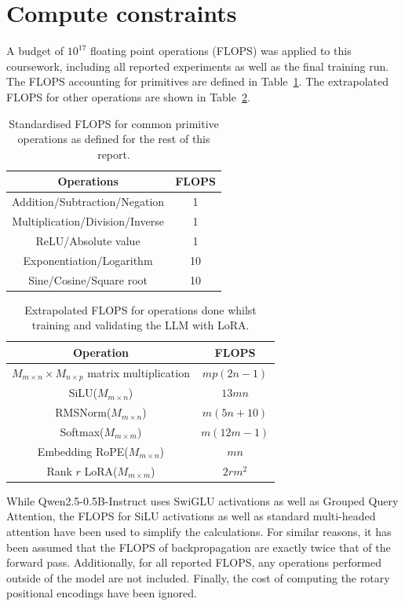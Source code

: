 \documentclass[11pt,a4paper]{article}
\renewcommand{\arraystretch}{0.8}
\begin{document}
\section{Compute constraints}
\label{sec:constraints}
A budget of $10^{17}$ floating point operations (FLOPS) was applied to this coursework, including all reported experiments as well as the final training run. The FLOPS accounting for primitives are defined in Table~\ref{tab:flops_primitives}. The extrapolated FLOPS for other operations are shown in Table~\ref{tab:flops_advanced}.
\renewcommand{\arraystretch}{1.2}
\begin{table}[h]
    \centering
    \begin{tabular}{c|c}
        Operations & FLOPS \\
        \hline
        Addition/Subtraction/Negation & 1 \\
        Multiplication/Division/Inverse & 1 \\
        ReLU/Absolute value & 1 \\
        Exponentiation/Logarithm & 10\\
        Sine/Cosine/Square root & 10 \\
        
    \end{tabular}
    \caption{Standardised FLOPS for common primitive operations as defined for the rest of this report.}
    \label{tab:flops_primitives}
\end{table}

\begin{table}
    \centering
    \begin{tabular}{c|c}
        Operation & FLOPS \\
        \hline
        $M_{m \times n} \times M_{n \times p}$ matrix multiplication & $mp(2n-1)$\\
        SiLU($M_{m \times n}$)& $13mn$ \\
        RMSNorm($M_{m \times n}$) & $m(5n + 10)$ \\
        Softmax($M_{m \times m}$) & $m(12m-1)$\\
        Embedding RoPE($M_{m \times n}$) & $mn$ \\ 
        Rank $r$ LoRA($M_{m \times m}$) & $2rm^2$
    \end{tabular}
    \caption{Extrapolated FLOPS for operations done whilst training and validating the LLM with LoRA.}
    \label{tab:flops_advanced}
\end{table}
While Qwen2.5-0.5B-Instruct uses SwiGLU activations as well as Grouped Query Attention, the FLOPS for SiLU activations as well as standard multi-headed attention have been used to simplify the calculations. For similar reasons, it has been assumed that the FLOPS of backpropagation are exactly twice that of the forward pass. Additionally, for all reported FLOPS, any operations performed outside of the model are not included. Finally, the cost of computing the rotary positional encodings have been ignored.
\end{document}
